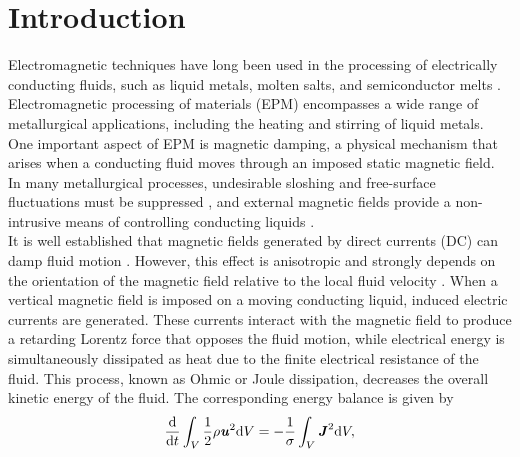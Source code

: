 \documentclass[aps,prfluids,reprint,superscriptaddress]{revtex4-2}
\newcommand{\h}[1]{\textbf{\textit{#1}}}
\begin{document}

\maketitle

\section{Introduction}
\label{sec:intro}

Electromagnetic techniques have long been used in the processing of electrically conducting fluids, such as liquid metals, molten salts, and semiconductor melts \cite{Asai1989, Garnier1990}. Electromagnetic processing of materials (EPM) encompasses a wide range of metallurgical applications, including the heating and stirring of liquid metals. One important aspect of EPM is magnetic damping, a physical mechanism that arises when a conducting fluid moves through an imposed static magnetic field. In many metallurgical processes, undesirable sloshing and free-surface fluctuations must be suppressed \cite{Guthrie2004}, and external magnetic fields provide a non-intrusive means of controlling conducting liquids \cite{Davidson1999, Lofgren2000}.
\\
\indent It is well established that magnetic fields generated by direct currents (DC) can damp fluid motion \cite{Fraenkel1960, Moffatt1967, Davidson1995}. However, this effect is anisotropic and strongly depends on the orientation of the magnetic field relative to the local fluid velocity \cite{Davidson2001}. When a vertical magnetic field is imposed on a moving conducting liquid, induced electric currents are generated. These currents interact with the magnetic field to produce a retarding Lorentz force that opposes the fluid motion, while electrical energy is simultaneously dissipated as heat due to the finite electrical resistance of the fluid. This process, known as Ohmic or Joule dissipation, decreases the overall kinetic energy of the fluid. The corresponding energy balance is given by
\begin{equation}
	\dv{}{t}\int_V \frac{1}{2} \rho \h u^2 \mathrm dV
	= -\frac{1}{\sigma} \int_V \h J^2 \mathrm dV,
	\label{eq}
\end{equation}
\end{document}

